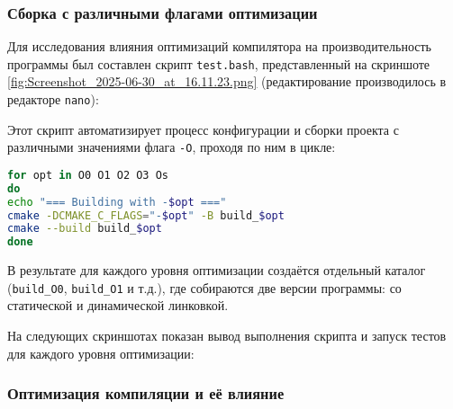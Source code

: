 \subsubsection{Сборка с различными флагами оптимизации}

Для исследования влияния оптимизаций компилятора на производительность программы был составлен скрипт \texttt{test.bash}, представленный на скриншоте \ref{fig:Screenshot_2025-06-30_at_16.11.23.png} (редактирование производилось в редакторе \texttt{nano}):


\noindent Этот скрипт автоматизирует процесс конфигурации и сборки проекта с различными значениями флага \texttt{-O}, проходя по ним в цикле:
\begin{lstlisting}[language=bash]
for opt in O0 O1 O2 O3 Os
do
echo "=== Building with -$opt ==="
cmake -DCMAKE_C_FLAGS="-$opt" -B build_$opt
cmake --build build_$opt
done
\end{lstlisting}

\noindent В результате для каждого уровня оптимизации создаётся отдельный каталог (\texttt{build\_O0}, \texttt{build\_O1} и т.д.), где собираются две версии программы: со статической и динамической линковкой.

На следующих скриншотах показан вывод выполнения скрипта и запуск тестов для каждого уровня оптимизации:




\subsubsection{Оптимизация компиляции и её влияние}

